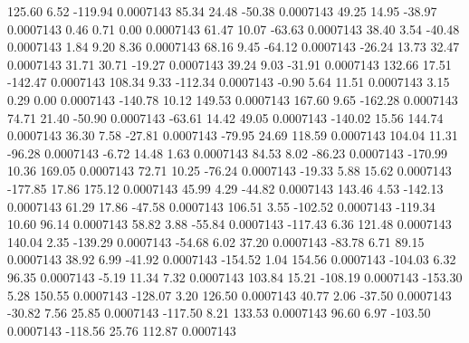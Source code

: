       125.60        6.52     -119.94     0.0007143
       85.34       24.48      -50.38     0.0007143
       49.25       14.95      -38.97     0.0007143
        0.46        0.71        0.00     0.0007143
       61.47       10.07      -63.63     0.0007143
       38.40        3.54      -40.48     0.0007143
        1.84        9.20        8.36     0.0007143
       68.16        9.45      -64.12     0.0007143
      -26.24       13.73       32.47     0.0007143
       31.71       30.71      -19.27     0.0007143
       39.24        9.03      -31.91     0.0007143
      132.66       17.51     -142.47     0.0007143
      108.34        9.33     -112.34     0.0007143
       -0.90        5.64       11.51     0.0007143
        3.15        0.29        0.00     0.0007143
     -140.78       10.12      149.53     0.0007143
      167.60        9.65     -162.28     0.0007143
       74.71       21.40      -50.90     0.0007143
      -63.61       14.42       49.05     0.0007143
     -140.02       15.56      144.74     0.0007143
       36.30        7.58      -27.81     0.0007143
      -79.95       24.69      118.59     0.0007143
      104.04       11.31      -96.28     0.0007143
       -6.72       14.48        1.63     0.0007143
       84.53        8.02      -86.23     0.0007143
     -170.99       10.36      169.05     0.0007143
       72.71       10.25      -76.24     0.0007143
      -19.33        5.88       15.62     0.0007143
     -177.85       17.86      175.12     0.0007143
       45.99        4.29      -44.82     0.0007143
      143.46        4.53     -142.13     0.0007143
       61.29       17.86      -47.58     0.0007143
      106.51        3.55     -102.52     0.0007143
     -119.34       10.60       96.14     0.0007143
       58.82        3.88      -55.84     0.0007143
     -117.43        6.36      121.48     0.0007143
      140.04        2.35     -139.29     0.0007143
      -54.68        6.02       37.20     0.0007143
      -83.78        6.71       89.15     0.0007143
       38.92        6.99      -41.92     0.0007143
     -154.52        1.04      154.56     0.0007143
     -104.03        6.32       96.35     0.0007143
       -5.19       11.34        7.32     0.0007143
      103.84       15.21     -108.19     0.0007143
     -153.30        5.28      150.55     0.0007143
     -128.07        3.20      126.50     0.0007143
       40.77        2.06      -37.50     0.0007143
      -30.82        7.56       25.85     0.0007143
     -117.50        8.21      133.53     0.0007143
       96.60        6.97     -103.50     0.0007143
     -118.56       25.76      112.87     0.0007143

